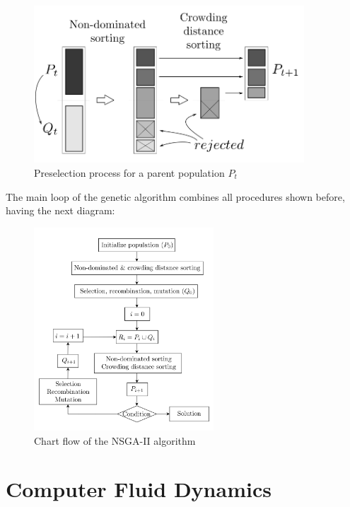 \begin{itemize}
        \begin{figure}[h!]
        \centering
        \includegraphics[width=0.9\textwidth]{Figures/2/preselection5.png}
        \caption{Preselection process for a parent population $P_t$}
        \label{fig:preselection process}
    \end{figure}
\end{itemize}
    
The main loop of the genetic algorithm combines all procedures shown before, having the next diagram:

\begin{figure}[h!]
        \centering
        \includegraphics[width=0.6\textwidth]{Figures/2/NSGAflow.png}
        \caption{Chart flow of the NSGA-II algorithm }
        \label{fig:chartFlowNSGAII}
\end{figure}

\newpage

\section{Computer Fluid Dynamics}

